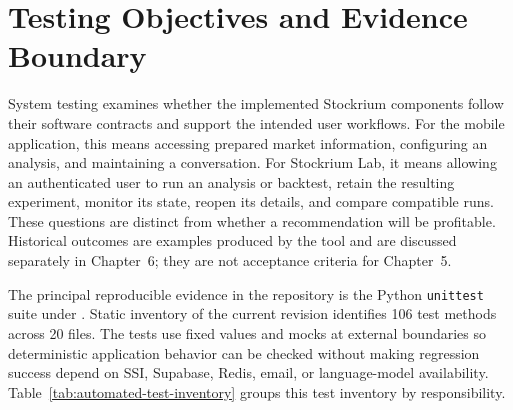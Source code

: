 \section{Testing Objectives and Evidence Boundary}
\label{sec:testing-objectives-evidence}

System testing examines whether the implemented Stockrium components follow their software contracts and support the intended user workflows. For the mobile application, this means accessing prepared market information, configuring an analysis, and maintaining a conversation. For Stockrium Lab, it means allowing an authenticated user to run an analysis or backtest, retain the resulting experiment, monitor its state, reopen its details, and compare compatible runs. These questions are distinct from whether a recommendation will be profitable. Historical outcomes are examples produced by the tool and are discussed separately in Chapter~6; they are not acceptance criteria for Chapter~5.

The principal reproducible evidence in the repository is the Python \texttt{unittest} suite under . Static inventory of the current revision identifies 106 test methods across 20 files. The tests use fixed values and mocks at external boundaries so deterministic application behavior can be checked without making regression success depend on SSI, Supabase, Redis, email, or language-model availability. Table~\ref{tab:automated-test-inventory} groups this test inventory by responsibility.

